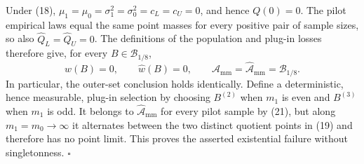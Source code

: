 Under (18), \(\mu_1=\mu_0=\sigma_1^2=\sigma_0^2=c_L=c_U=0\), and hence \(Q(0)=0\).  The pilot empirical laws equal the same point masses for every positive pair of sample sizes, so also \(\widehat Q_L=\widehat Q_U=0\).  The definitions of the population and plug-in losses therefore give, for every \(B\in\mathcal B_{1/8}\),
\[
w(B)=0,
\qquad
\widehat w(B)=0,
\qquad
\mathcal A_{\mathrm{mm}}
=\widehat{\mathcal A}_{\mathrm{mm}}
=\mathcal B_{1/8}.
\tag{21}
\]
In particular, the outer-set conclusion holds identically.  Define a deterministic, hence measurable, plug-in selection by choosing \(B^{(2)}\) when \(m_1\) is even and \(B^{(3)}\) when \(m_1\) is odd.  It belongs to \(\widehat{\mathcal A}_{\mathrm{mm}}\) for every pilot sample by (21), but along \(m_1=m_0\to\infty\) it alternates between the two distinct quotient points in (19) and therefore has no point limit.  This proves the asserted existential failure without singletonness. \(\square\)